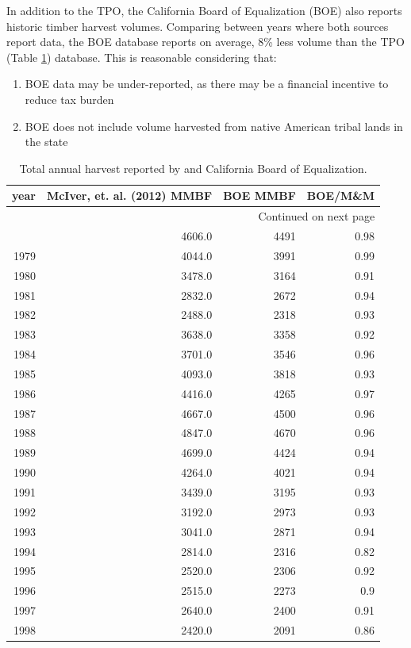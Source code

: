 \documentclass[a4paper]{article}
\begin{document}
In addition to the TPO, the California Board of Equalization (BOE) also
reports historic timber harvest volumes.  Comparing between years where both
sources report data, the BOE database reports on average, 8\% less volume than the TPO (Table \ref{tab:tpo_boe}) database. This is reasonable considering that:
\begin{enumerate}
\item BOE data may be under-reported, as there may be a financial incentive to reduce tax burden
\item BOE does not include volume harvested from native American tribal lands in the state
\end{enumerate}

\begin{longtable}{rrrr}
\caption{Total annual harvest reported by \citet{Mciver2012} and California Board of Equalization.\label{tab:tpo_boe}}
\\
year & McIver, et. al. (2012) MMBF & BOE MMBF & BOE/M\&M\\
\hline
\endhead
\hline\multicolumn{4}{r}{Continued on next page} \\
\endfoot
\endlastfoot
1978 & 4606.0 & 4491 & 0.98\\
1979 & 4044.0 & 3991 & 0.99\\
1980 & 3478.0 & 3164 & 0.91\\
1981 & 2832.0 & 2672 & 0.94\\
1982 & 2488.0 & 2318 & 0.93\\
1983 & 3638.0 & 3358 & 0.92\\
1984 & 3701.0 & 3546 & 0.96\\
1985 & 4093.0 & 3818 & 0.93\\
1986 & 4416.0 & 4265 & 0.97\\
1987 & 4667.0 & 4500 & 0.96\\
1988 & 4847.0 & 4670 & 0.96\\
1989 & 4699.0 & 4424 & 0.94\\
1990 & 4264.0 & 4021 & 0.94\\
1991 & 3439.0 & 3195 & 0.93\\
1992 & 3192.0 & 2973 & 0.93\\
1993 & 3041.0 & 2871 & 0.94\\
1994 & 2814.0 & 2316 & 0.82\\
1995 & 2520.0 & 2306 & 0.92\\
1996 & 2515.0 & 2273 & 0.9\\
1997 & 2640.0 & 2400 & 0.91\\
1998 & 2420.0 & 2091 & 0.86\\

\end{longtable}
\end{document}

